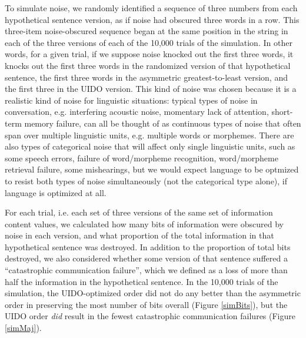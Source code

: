\documentclass[12pt]{article}
\begin{document}
To simulate noise, we randomly identified a sequence of three numbers from each hypothetical sentence version, as if noise had obscured three words in a row. This three-item noise-obscured sequence began at the same position in the string in each of the three versions of each of the 10,000 trials of the simulation. In other words, for a given trial, if we suppose noise knocked out the first three words, it knocks out the first three words in the randomized version of that hypothetical sentence, the first three words in the asymmetric greatest-to-least version, and the first three in the UIDO version. This kind of noise was chosen because it is a realistic kind of noise for linguistic situations: typical types of noise in conversation, e.g. interfering acoustic noise, momentary lack of attention, short-term memory failure, can all be thought of as continuous types of noise that often span over multiple linguistic units, e.g. multiple words or morphemes. There are also types of categorical noise that will affect only single linguistic units, such as some speech errors, failure of word/morpheme recognition, word/morpheme retrieval failure, some mishearings, but we would expect language to be optmized to resist both types of noise simultaneously (not the categorical type alone), if language is optimized at all.

For each trial, i.e. each set of three versions of the same set of information content values, we calculated how many bits of information were obscured by noise in each version, and what proportion of the total information in that hypothetical sentence was destroyed.  In addition to the proportion of total bits destroyed, we also considered whether some version of that sentence suffered a ``catastrophic communication failure'', which we defined as a loss of more than half the information in the hypothetical sentence. In the 10,000 trials of the simulation, the UIDO-optimized order did not do any better than the asymmetric order in preserving the most number of bits overall (Figure \ref{simBits}), but the UIDO order \textsl{did} result in the fewest catastrophic communication failures (Figure \ref{simMaj}).
\end{document}
